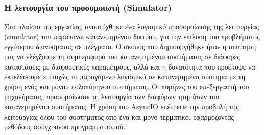 



\subsubsection{Η λειτουργία του προσομοιωτή \lt (Simulator)}  

Στα πλαίσια της εργασίας, αναπτύχθηκε ένα λογισμικό προσομοίωσης της λειτουργίας (simulator) του παραπάνω κατανεμημένου δικτύου, για την επίλυση του προβλήματος εγγύτερου διανύσματος σε πλέγματα. Ο σκοπός που δημιουργήθηκε ήταν η απαίτηση μας να ελέγξουμε τη συμπεριφορά του κατανεμημένου συστήματος σε διάφορες καταστάσεις με διαφορετικές παραμέτρους, αλλά και η δυνατότητα που προέκυψε να εκτελέσουμε επιτυχώς το παραγόμενο λογισμικό σε κατανεμημένο σύστημα με τη χρήση ενός και μόνου πολυπύρηνου συστήματος. Οι πυρήνες του επεξεργαστή του μηχανήματος, προσομοίωσαν τη λειτουργία των διαφόρων τμημάτων του κατανεμημένου συστήματος. Η χρήση του AsyncIO επέτρεψε την προβολή της λειτουργίας όλου του συστήματος από ένα και μόνο τερματικό, εφαρμόζοντας μεθόδους ασύγχρονου \mbox{προγραμματισμού.}  

